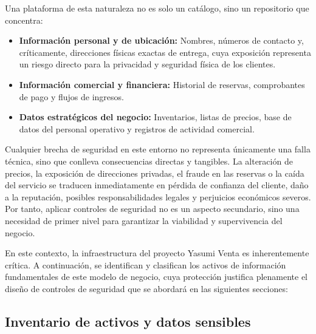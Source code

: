 \documentclass[12pt,letterpaper]{article}
\begin{document}
Una plataforma de esta naturaleza no es solo un catálogo, sino un repositorio que concentra:
\begin{itemize}
    \item \textbf{Información personal y de ubicación:} Nombres, números de contacto y, críticamente, direcciones físicas exactas de entrega, cuya exposición representa un riesgo directo para la privacidad y seguridad física de los clientes.
    \item \textbf{Información comercial y financiera:} Historial de reservas, comprobantes de pago y flujos de ingresos.
    \item \textbf{Datos estratégicos del negocio:} Inventarios, listas de precios, base de datos del personal operativo y registros de actividad comercial.
\end{itemize}

Cualquier brecha de seguridad en este entorno no representa únicamente una falla técnica, sino que conlleva consecuencias directas y tangibles. La alteración de precios, la exposición de direcciones privadas, el fraude en las reservas o la caída del servicio se traducen inmediatamente en pérdida de confianza del cliente, daño a la reputación, posibles responsabilidades legales y perjuicios económicos severos. Por tanto, aplicar controles de seguridad no es un aspecto secundario, sino una necesidad de primer nivel para garantizar la viabilidad y supervivencia del negocio.

En este contexto, la infraestructura del proyecto Yasumi Venta es inherentemente crítica. A continuación, se identifican y clasifican los activos de información fundamentales de este modelo de negocio, cuya protección justifica plenamente el diseño de controles de seguridad que se abordará en las siguientes secciones:
\pagebreak
\subsection{Inventario de activos y datos sensibles}
\end{document}
